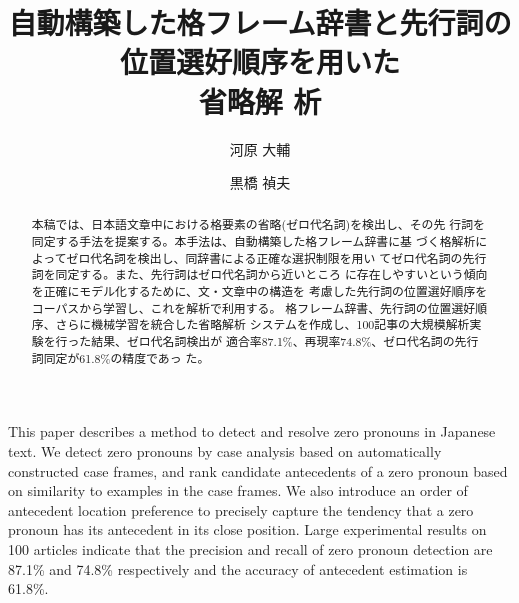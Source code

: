 \documentclass{nlp}
\begin{document}
\setcounter{page}{1}
\setcounter{Volume}{9}
\setcounter{Number}{1}
\setcounter{Month}{1}

\setcounter{secnumdepth}{2}

\title{自動構築した格フレーム辞書と先行詞の位置選好順序を用いた\\省略解
析}
\author{河原 大輔 \and 黒橋 禎夫
}



\begin{abstract}
 本稿では、日本語文章中における格要素の省略(ゼロ代名詞)を検出し、その先
 行詞を同定する手法を提案する。本手法は、自動構築した格フレーム辞書に基
 づく格解析によってゼロ代名詞を検出し、同辞書による正確な選択制限を用い
 てゼロ代名詞の先行詞を同定する。また、先行詞はゼロ代名詞から近いところ
 に存在しやすいという傾向を正確にモデル化するために、文・文章中の構造を
 考慮した先行詞の位置選好順序をコーパスから学習し、これを解析で利用する。
 格フレーム辞書、先行詞の位置選好順序、さらに機械学習を統合した省略解析
 システムを作成し、100記事の大規模解析実験を行った結果、ゼロ代名詞検出が
 適合率87.1\%、再現率74.8\%、ゼロ代名詞の先行詞同定が61.8\%の精度であっ
 た。
\end{abstract}




\begin{eabstract}
This paper describes a method to detect and resolve zero pronouns in
Japanese text. We detect zero pronouns by case analysis based on
automatically constructed case frames, and rank candidate antecedents of
a zero pronoun based on similarity to examples in the case frames. We
also introduce an order of antecedent location preference to precisely
capture the tendency that a zero pronoun has its antecedent in its close
position. Large experimental results on 100 articles indicate that the
precision and recall of zero pronoun detection are 87.1\% and 74.8\%
respectively and the accuracy of antecedent estimation is 61.8\%.
\end{eabstract}
\end{document}
